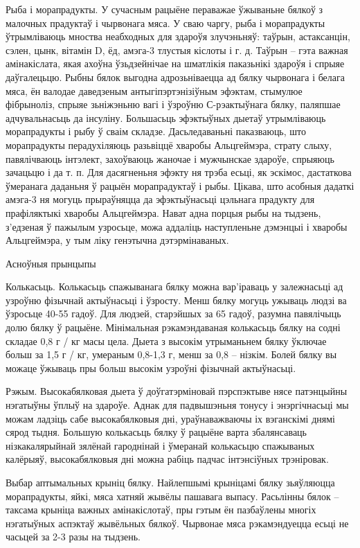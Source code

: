 Рыба і морапрадукты.
У сучасным рацыёне пераважае ўжываньне бялкоў з малочных прадуктаў і чырвонага мяса. У сваю чаргу, рыба і морапрадукты ўтрымліваюць мноства неабходных для здароўя злучэньняў: таўрын, астаксанцін, сэлен, цынк, вітамін D, ёд, амэга-3 тлустыя кіслоты і г. д. Таўрын – гэта важная амінакіслата, якая ахоўна ўзьдзейнічае на шматлікія паказьнікі здароўя і спрыяе даўгалецьцю. Рыбны бялок выгодна адрозьніваецца ад бялку чырвонага і белага мяса, ён валодае даведзеным антыгіпэртэнізіўным эфэктам, стымулюе фібрыноліз, спрыяе зьніжэньню вагі і ўзроўню С-рэактыўнага бялку, паляпшае адчувальнасьць да інсуліну. Большасьць эфэктыўных дыетаў утрымліваюць морапрадукты і рыбу ў сваім складзе.
Дасьледаваньні паказваюць, што морапрадукты перадухіляюць разьвіццё хваробы Альцгеймэра, страту слыху, павялічваюць інтэлект, захоўваюць жаночае і мужчынскае здароўе, спрыяюць зачацьцю і да т. п. Для дасягненьня эфэкту ня трэба есьці, як эскімос, дастаткова ўмеранага даданьня ў рацыён морапрадуктаў і рыбы. Цікава, што асобныя дадаткі амэга-3 ня могуць прыраўняцца да эфэктыўнасьці цэльнага прадукту для прафіляктыкі хваробы Альцгеймэра. Нават адна порцыя рыбы на тыдзень, з'едзеная ў пажылым узросьце, можа аддаліць наступленьне дэмэнцыі і хваробы Альцгеймэра, у тым ліку генэтычна дэтэрмінаваных.

Асноўныя прынцыпы

Колькасьць.
Колькасьць спажыванага бялку можна вар'іраваць у залежнасьці ад узроўню фізычнай актыўнасьці і ўзросту. Менш бялку могуць ужываць людзі ва ўзросьце 40-55 гадоў. Для людзей, старэйшых за 65 гадоў, разумна павялічыць долю бялку ў рацыёне. Мінімальная рэкамэндаваная колькасьць бялку на содні складае 0,8 г / кг масы цела. Дыета з высокім утрыманьнем бялку ўключае больш за 1,5 г / кг, умераным 0,8-1,3 г, менш за 0,8 – нізкім. Болей бялку вы можаце ўжываць пры больш высокім узроўні фізычнай актыўнасьці.

Рэжым.
Высокабялковая дыета ў доўгатэрміновай пэрспэктыве нясе патэнцыйны нэгатыўны ўплыў на здароўе. Аднак для падвышэньня тонусу і энэргічнасьці мы можам ладзіць сабе высокабялковыя дні, ураўнаважваючы іх вэганскімі днямі сярод тыдня. Большую колькасьць бялку ў рацыёне варта збалянсаваць нізкакалярыйнай зялёнай гароднінай і ўмеранай колькасьцю спажываных калёрыяў, высокабялковыя дні можна рабіць падчас інтэнсіўных трэніровак.

Выбар аптымальных крыніц бялку.
Найлепшымі крыніцамі бялку зьяўляюцца морапрадукты, яйкі, мяса хатняй жывёлы пашавага выпасу. Расьлінны бялок – таксама крыніца важных амінакіслотаў, пры гэтым ён пазбаўлены многіх нэгатыўных аспэктаў жывёльных бялкоў. Чырвонае мяса рэкамэндуецца есьці не часьцей за 2-3 разы на тыдзень.

